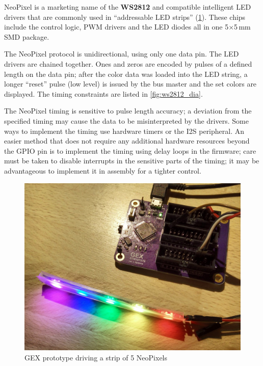 NeoPixel is a marketing name of the \textbf{WS2812} and compatible intelligent \gls{LED} drivers that are commonly used in ``addressable \gls{LED} strips'' (\cref{fig:neopic}).  These chips include the control logic, PWM drivers and the \gls{LED} diodes all in one 5$\times$5\,mm SMD package.

The NeoPixel protocol is unidirectional, using only one data pin. The \gls{LED} drivers are chained together. Ones and zeros are encoded by pulses of a defined length on the data pin; after the color data was loaded into the \gls{LED} string, a longer ``reset'' pulse (low level) is issued by the bus master and the set colors are displayed. The timing constraints are listed in \cref{fig:ws2812_dia}.

The NeoPixel timing is sensitive to pulse length accuracy; a deviation from the specified timing may cause the data to be misinterpreted by the drivers. Some ways to implement the timing use hardware timers or the \gls{I2S} peripheral. An easier method that does not require any additional hardware resources beyond the \gls{GPIO} pin is to implement the timing using delay loops in the firmware; care must be taken to disable interrupts in the sensitive parts of the timing; it may be advantageous to implement it in assembly for a tighter control.

\begin{figure}[h]
	\centering
	\includegraphics[width=.7\textwidth] {img/npxdriven.jpg}
	\caption{\label{fig:neopic}GEX prototype driving a strip of 5 NeoPixels}
\end{figure}

